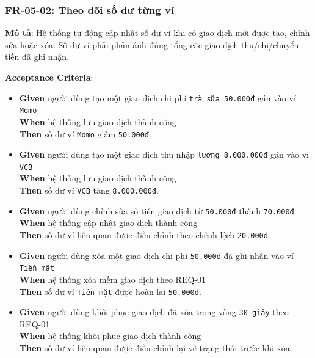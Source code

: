 \subsubsection{FR-05-02: Theo dõi số dư từng ví}

\textbf{Mô tả}: Hệ thống tự động cập nhật số dư ví khi có giao dịch mới được tạo, chỉnh sửa hoặc xóa. Số dư ví phải phản ánh đúng tổng các giao dịch thu/chi/chuyển tiền đã ghi nhận.



\textbf{Acceptance Criteria}:

\begin{itemize}
\item \textbf{Given} người dùng tạo một giao dịch chi phí \texttt{trà sữa 50.000đ} gán vào ví \texttt{Momo}  \\ \hspace*{1.5em}  \textbf{When} hệ thống lưu giao dịch thành công  \\ \hspace*{1.5em}  \textbf{Then} số dư ví \texttt{Momo} giảm \texttt{50.000đ}.
\item \textbf{Given} người dùng tạo một giao dịch thu nhập \texttt{lương 8.000.000đ} gán vào ví \texttt{VCB}  \\ \hspace*{1.5em}  \textbf{When} hệ thống lưu giao dịch thành công  \\ \hspace*{1.5em}  \textbf{Then} số dư ví \texttt{VCB} tăng \texttt{8.000.000đ}.
\item \textbf{Given} người dùng chỉnh sửa số tiền giao dịch từ \texttt{50.000đ} thành \texttt{70.000đ}  \\ \hspace*{1.5em}  \textbf{When} hệ thống cập nhật giao dịch thành công  \\ \hspace*{1.5em}  \textbf{Then} số dư ví liên quan được điều chỉnh theo chênh lệch \texttt{20.000đ}.
\item \textbf{Given} người dùng xóa một giao dịch chi phí \texttt{50.000đ} đã ghi nhận vào ví \texttt{Tiền mặt}  \\ \hspace*{1.5em}  \textbf{When} hệ thống xóa mềm giao dịch theo REQ-01  \\ \hspace*{1.5em}  \textbf{Then} số dư ví \texttt{Tiền mặt} được hoàn lại \texttt{50.000đ}.
\item \textbf{Given} người dùng khôi phục giao dịch đã xóa trong vòng \texttt{30 giây} theo REQ-01  \\ \hspace*{1.5em}  \textbf{When} hệ thống khôi phục giao dịch thành công  \\ \hspace*{1.5em}  \textbf{Then} số dư ví liên quan được điều chỉnh lại về trạng thái trước khi xóa.

\end{itemize}

